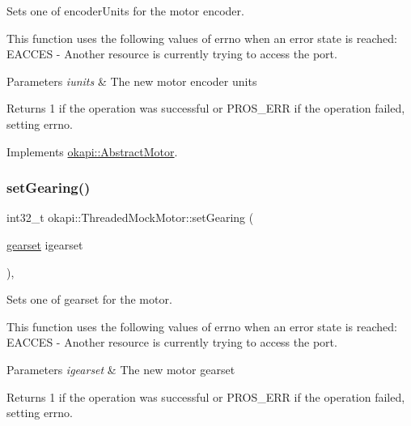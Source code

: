 Sets one of encoder\+Units for the motor encoder. 

This function uses the following values of errno when an error state is reached\+: E\+A\+C\+C\+ES -\/ Another resource is currently trying to access the port.


\begin{DoxyParams}{Parameters}
{\em iunits} & The new motor encoder units \\
\hline
\end{DoxyParams}
\begin{DoxyReturn}{Returns}
1 if the operation was successful or P\+R\+O\+S\+\_\+\+E\+RR if the operation failed, setting errno. 
\end{DoxyReturn}


Implements \mbox{\hyperlink{classokapi_1_1AbstractMotor_aae559b72399b0eb2124d969e40f97415}{okapi\+::\+Abstract\+Motor}}.

\mbox{\label{classokapi_1_1ThreadedMockMotor_aceeda6e1bf51f5c971c52b2528c48319}} 
\subsubsection{\texorpdfstring{setGearing()}{setGearing()}}
{\footnotesize\ttfamily int32\+\_\+t okapi\+::\+Threaded\+Mock\+Motor\+::set\+Gearing (\begin{DoxyParamCaption}\item[{\mbox{\hyperlink{classokapi_1_1AbstractMotor_a88aaa6ea2fa10f5520a537bbf26774d5}{gearset}}}]{igearset }\end{DoxyParamCaption})\hspace{0.3cm}{\ttfamily [override]}, {\ttfamily [virtual]}}



Sets one of gearset for the motor. 

This function uses the following values of errno when an error state is reached\+: E\+A\+C\+C\+ES -\/ Another resource is currently trying to access the port.


\begin{DoxyParams}{Parameters}
{\em igearset} & The new motor gearset \\
\hline
\end{DoxyParams}
\begin{DoxyReturn}{Returns}
1 if the operation was successful or P\+R\+O\+S\+\_\+\+E\+RR if the operation failed, setting errno. 
\end{DoxyReturn}


